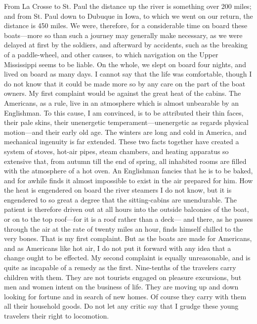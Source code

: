 From La Crosse to St. Paul the distance up the river is something
over 200 miles; and from St. Paul down to Dubuque in Iowa, to which
we went on our return, the distance is 450 miles.  We were,
therefore, for a considerable time on board these boats---more so
than such a journey may generally make necessary, as we were
delayed at first by the soldiers, and afterward by accidents, such
as the breaking of a paddle-wheel, and other causes, to which
navigation on the Upper Mississippi seems to be liable.  On the
whole, we slept on board four nights, and lived on board as many
days.  I cannot say that the life was comfortable, though I do not
know that it could be made more so by any care on the part of the
boat owners.  My first complaint would be against the great heat of
the cabins.  The Americans, as a rule, live in an atmosphere which
is almost unbearable by an Englishman.  To this cause, I am
convinced, is to be attributed their thin faces, their pale skins,
their unenergetic temperament---unenergetic as regards physical
motion---and their early old age.  The winters are long and cold in
America, and mechanical ingenuity is far extended.  These two facts
together have created a system of stoves, hot-air pipes, steam
chambers, and heating apparatus so extensive that, from autumn till
the end of spring, all inhabited rooms are filled with the
atmosphere of a hot oven.  An Englishman fancies that he is to be
baked, and for awhile finds it almost impossible to exist in the
air prepared for him.  How the heat is engendered on board the
river steamers I do not know, but it is engendered to so great a
degree that the sitting-cabins are unendurable.  The patient is
therefore driven out at all hours into the outside balconies of the
boat, or on to the top roof---for it is a roof rather than a deck---%
and there, as he passes through the air at the rate of twenty miles
an hour, finds himself chilled to the very bones.  That is my first
complaint.  But as the boats are made for Americans, and as
Americans like hot air, I do not put it forward with any idea that
a change ought to be effected.  My second complaint is equally
unreasonable, and is quite as incapable of a remedy as the first.
Nine-tenths of the travelers carry children with them.  They are
not tourists engaged on pleasure excursions, but men and women
intent on the business of life.  They are moving up and down
looking for fortune and in search of new homes.  Of course they
carry with them all their household goods.  Do not let any critic
say that I grudge these young travelers their right to locomotion.
